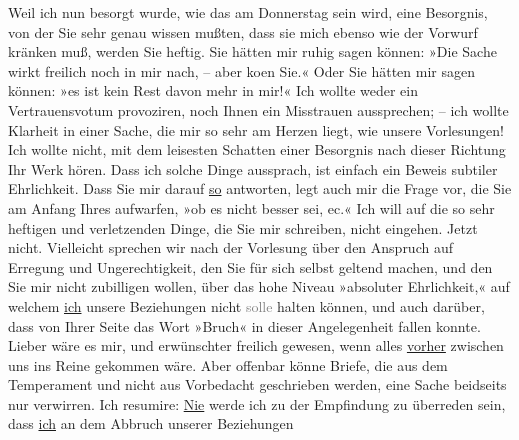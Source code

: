 \begin{ledgroupsized}[t]{13cm}
               Weil ich nun besorgt wurde, wie das am Donnerstag sein
               wird, eine Besorgnis, von der Sie sehr genau wissen mußten, dass sie mich ebenso wie
               der Vorwurf kränken muß, werden Sie heftig.\pend
           \pstart
           Sie hätten mir ruhig sagen können: »Die Sache wirkt freilich noch in mir nach, – aber
                  ko{\geminationm}en {\pb}Sie.« Oder Sie hätten mir sagen
               können: »es ist kein Rest davon mehr in mir!« Ich wollte weder ein Vertrauensvotum
               provoziren, noch Ihnen ein Misstrauen aussprechen; – ich wollte Klarheit in einer
               Sache, die mir so sehr am Herzen liegt, wie unsere Vorlesungen! Ich wollte nicht, mit
               dem leisesten Schatten einer Besorgnis nach dieser Richtung Ihr Werk hören. Dass ich solche Dinge
               aussprach, ist einfach ein Beweis subtiler Ehrlichkeit. Dass Sie mir darauf \uline{so} antworten, legt auch mir die Frage vor, die Sie am
               Anfang Ihres \label{K_L03355-4v}\label{K_L03355-4h} aufwarfen, »ob es nicht besser sei, ec.«\pend
           \pstart
           Ich will auf die so sehr heftigen und verletzenden Dinge, die Sie mir schreiben,
               nicht eingehen. Jetzt nicht. Vielleicht sprechen wir nach der Vorlesung über den
               Anspruch auf Erregung und Ungerechtigkeit, den Sie für sich selbst geltend machen,
               und den Sie mir nicht zubilligen wollen, über das hohe Niveau »absoluter
               Ehrlichkeit,« auf welchem \uline{ich} unsere Beziehungen
               nicht \textcolor{gray}{solle} halten können, und auch darüber, dass von Ihrer Seite
               das Wort »Bruch« in dieser Angelegenheit fallen konnte. Lieber wäre es mir, und
               erwünschter freilich gewesen, wenn alles \uline{vorher}
               zwischen uns ins Reine gekommen wäre. Aber offenbar könne
               Briefe, die aus dem Temperament und nicht aus Vorbedacht geschrieben werden, eine
               Sache beidseits nur verwirren. Ich resumire: \uline{Nie} werde ich {\pb}zu der Empfindung zu überreden
               sein, dass \uline{ich} an dem Abbruch unserer Beziehungen

\end{ledgroupsized}
